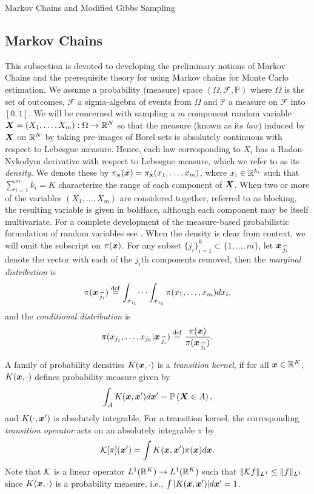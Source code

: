 \begin{chapter}{Markov Chains and Modified Gibbs Sampling}
  \subsection{Markov Chains}
This subsection is devoted to developing the preliminary notions of Markov Chains and the prerequisite theory for using Markov chains for Monte Carlo estimation. 
We assume a probability (measure) space $(\Omega,\mathcal F,\mathbb P)$ where $\Omega$ is the set of outcomes, $\mathcal F$ a sigma-algebra of events from $\Omega$ and $\mathbb P$ a measure on $\mathcal F$ into $[0,1]$.
We will be concerned with sampling a $m$ component random variable $\mbox{\boldmath$X$} = (X_1,\dots,X_m):\Omega \to \mathbb R^N$ so that the measure (known as its \emph{law}) induced by $\mbox{\boldmath$X$}$ on $\mathbb R^N$ by taking pre-images of Borel sets is absolutely continuous with respect to Lebesgue measure.
Hence, each law corresponding to $X_i$ has a Radon-Nykodym derivative with respect to Lebesgue measure, which we refer to as its \emph{density}. 
We denote these by $\pi_{\textsc{\bf{x}}}(\mbox{\boldmath$x$}) = \pi_{\textsc{\bf{x}}}(x_1,\dots,x_m)$, where $x_i \in \mathbb R^{k_i}$ such that $\sum_{i=1}^m k_i = K$ characterize the range of each component of $\mbox{\boldmath$X$}$.
When two or more of the variables $(X_1,\dots,X_m)$ are considered together, referred to as blocking, the resulting variable is given in boldface, although each component may be itself multivariate.
For a complete development of the measure-based probabilistic formulation of random variables see \citep{durrett2010probability,billingsley2008probability}.
When the density is clear from context, we will omit the subscript on $\pi(\mbox{\boldmath$x$})$.
For any subset $\{j_i\}_{i=1}^k \subset \{1,\dots,m\}$, let $\mbox{\boldmath$x$}_{\,\widehat{j_i}}$ denote the vector with each of the $j_i$th components removed, then the \emph{marginal distribution} is
\begin{equation}
  \pi(\mbox{\boldmath$x$}_{\,\widehat{j_i}}) \stackrel{\rm def}{=} \int_{x_{j_1}}\dots\int_{x_{j_k}} \pi(x_1,\dots,x_m)dx_i,
\end{equation}
and the \emph{conditional distribution} is
\begin{equation} \label{eq:conditionalDefn}
  \pi(x_{j_1},\dots,x_{j_k}|\mbox{\boldmath$x$}_{\,\widehat{j_i}}) \stackrel{\rm def}{=} \frac{\pi(\mbox{\boldmath$x$})}{\pi(\mbox{\boldmath$x$}_{\,\widehat{j_i}})}.
\end{equation}
  
A family of probability densities $K(\mbox{\boldmath$x$},\cdot)$ is a \emph{transition kernel}, if for all $\mbox{\boldmath$x$} \in \mathbb R^K$, $K(\mbox{\boldmath$x$},\cdot)$ defines probability measure given by 
\begin{equation}
  \int_A K(\mbox{\boldmath$x$},\mbox{\boldmath$x$}') d\mbox{\boldmath$x$}' = \mathbb P\left( \mbox{\boldmath$X$} \in A \right),
\end{equation}
and $K(\cdot , \mbox{\boldmath$x$}')$ is absolutely integrable.
For a transition kernel, the corresponding \emph{transition operator} acts on an absolutely integrable $\pi$ by
\begin{equation}
  \mathcal K [\pi](\mbox{\boldmath$x$}') = \int K(\mbox{\boldmath$x$},\mbox{\boldmath$x$}') \pi(\mbox{\boldmath$x$})d\mbox{\boldmath$x$}. \label{eq:transitionKernel}
\end{equation}
Note that $\mathcal K$ is a linear operator $L^1(\mathbb R^K) \to L^1(\mathbb R^K)$ such that $\|\mathcal K f\|_{L^1} \le \|f\|_{L^1}$ since $K(\mbox{\boldmath$x$},\cdot)$ is a probability measure, i.e., $\int |K(\mbox{\boldmath$x$},\mbox{\boldmath$x$}')|d\mbox{\boldmath$x$}' = 1$.


\end{chapter}
